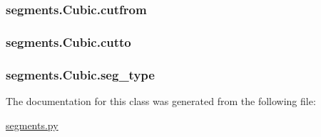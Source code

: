 \subsubsection[{cutfrom}]{\setlength{\rightskip}{0pt plus 5cm}segments.\+Cubic.\+cutfrom}\label{classsegments_1_1_cubic_aba3e470c7944341886bac2f751d7794a}
\hypertarget{classsegments_1_1_cubic_a2a6bbe67c22dca2202ee9abbee280275}{}
\subsubsection[{cutto}]{\setlength{\rightskip}{0pt plus 5cm}segments.\+Cubic.\+cutto}\label{classsegments_1_1_cubic_a2a6bbe67c22dca2202ee9abbee280275}
\hypertarget{classsegments_1_1_cubic_a3d87e63eecbf9da1becc55fb858a1f3a}{}
\subsubsection[{seg\+\_\+type}]{\setlength{\rightskip}{0pt plus 5cm}segments.\+Cubic.\+seg\+\_\+type}\label{classsegments_1_1_cubic_a3d87e63eecbf9da1becc55fb858a1f3a}


The documentation for this class was generated from the following file\+:\begin{DoxyCompactItemize}
\item 
\hyperlink{segments_8py}{segments.\+py}\end{DoxyCompactItemize}
